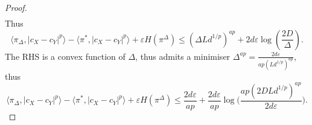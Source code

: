 \begin{proof}
\begin{equation}
\begin{split}
      \end{split}
    \end{equation}
    Thus
    \begin{equation}
      \langle \pi_{\Delta}, \vert c_X - c_Y \vert^p \rangle - \langle \pi^*, \vert c_X - c_Y \vert^p \rangle + \varepsilon H(\pi^{\Delta})
      \leq (\Delta Ld^{1/p})^{ap} + 2 d \varepsilon \log(\frac{2D}{\Delta}).
    \end{equation}
    The RHS is a convex function of $\Delta$, thus admits a minimiser $\Delta^{ap} = \frac{2d \varepsilon}{ap (Ld^{1/p})^{ap}}$, thus
    \begin{equation}
      \langle \pi_{\Delta}, \vert c_X - c_Y \vert^p \rangle - \langle \pi^*, \vert c_X - c_Y \vert^p \rangle + \varepsilon H(\pi^{\Delta})
      \leq \frac{2 d \varepsilon}{ap} + \frac{2d \varepsilon}{ap} \log\Big( \frac{ap (2DLd^{1/p})^{ap}}{2d \varepsilon} \Big).
    \end{equation}
\end{proof}

